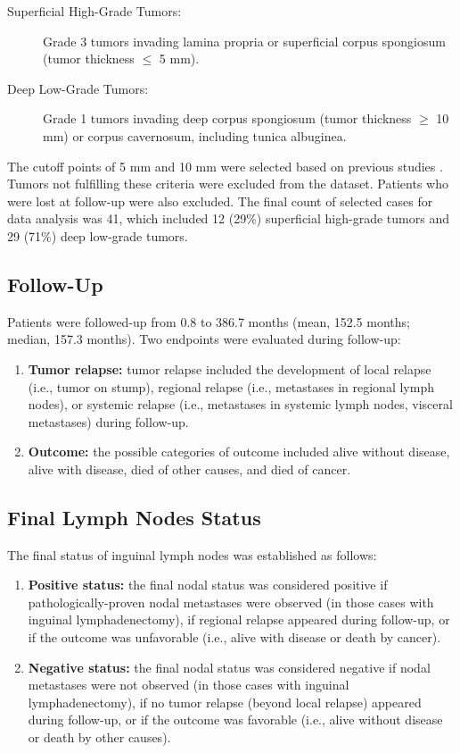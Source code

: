 \documentclass[11pt,letterpaper]{article}\usepackage[]{graphicx}\usepackage[]{color}
\begin{document}
\begin{multicols}{2}
\begin{description}
        \item[Superficial High-Grade Tumors:] Grade 3 tumors invading lamina propria or superficial corpus spongiosum (tumor thickness $\leq$ 5 mm).
        \item[Deep Low-Grade Tumors:] Grade 1 tumors invading deep corpus spongiosum (tumor thickness $\geq$ 10 mm) or corpus cavernosum, including tunica albuginea.
\end{description}

The cutoff points of 5 mm and 10 mm were selected based on previous studies \cite{Velazquez2008}. Tumors not fulfilling these criteria were excluded from the dataset. Patients who were lost at follow-up were also excluded. The final count of selected cases for data analysis was 41, which included 12 (29\%) superficial high-grade tumors and 29 (71\%) deep low-grade tumors.

\subsection*{Follow-Up}
Patients were followed-up from 0.8 to 386.7 months (mean, 152.5 months; median, 157.3 months). Two endpoints were evaluated during follow-up:
\begin{enumerate}
        \item \textbf{Tumor relapse:} tumor relapse included the development of local relapse (i.e., tumor on stump), regional relapse (i.e., metastases in regional lymph nodes), or systemic relapse (i.e., metastases in systemic lymph nodes, visceral metastases) during follow-up.
        \item \textbf{Outcome:} the possible categories of outcome included alive without disease, alive with disease, died of other causes, and died of cancer.
\end{enumerate}

\subsection*{Final Lymph Nodes Status}
The final status of inguinal lymph nodes was established as follows: 
\begin{enumerate}
        \item \textbf{Positive status:} the final nodal status was considered positive if pathologically-proven nodal metastases were observed (in those cases with inguinal lymphadenectomy), if regional relapse appeared during follow-up, or if the outcome was unfavorable (i.e., alive with disease or death by cancer).
        \item \textbf{Negative status:} the final nodal status was considered negative if nodal metastases were not observed (in those cases with inguinal lymphadenectomy), if no tumor relapse (beyond local relapse) appeared during follow-up, or if the outcome was favorable (i.e., alive without disease or death by other causes).
\end{enumerate}


\end{multicols}
\end{document}
